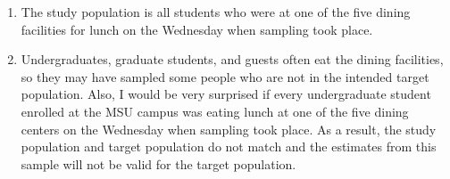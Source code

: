 \documentclass[11pt]{article}
\begin{document}
\begin{doublespace}
\begin{enumerate}
\begin{enumerate}
\item The study population is all students who were at one of the five dining facilities for lunch on the Wednesday when sampling took place.

\item Undergraduates, graduate students, and guests often eat the dining facilities, so they may have sampled some people who are not in the intended target population. Also, I would be very surprised if every undergraduate student enrolled at the MSU campus was eating lunch at one of the five dining centers on the Wednesday when sampling took place. As a result, the study population and target population do not match and the estimates from this sample will not be valid for the target population.

\end{enumerate}

\end{enumerate}

\end{doublespace}
\end{document}
